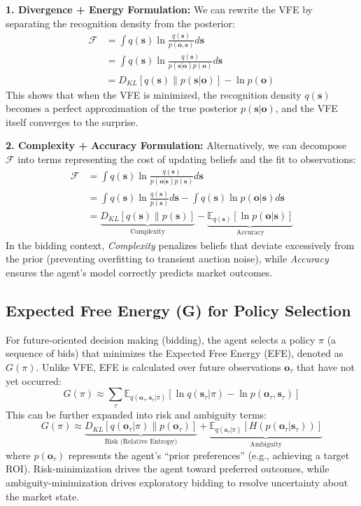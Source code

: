 \textbf{1. Divergence + Energy Formulation:}
We can rewrite the VFE by separating the recognition density from the posterior:
\begin{align}
    \mathcal{F} &= \int q(\mathbf{s}) \ln \frac{q(\mathbf{s})}{p(\mathbf{o}, \mathbf{s})} d\mathbf{s} \\
    &= \int q(\mathbf{s}) \ln \frac{q(\mathbf{s})}{p(\mathbf{s}|\mathbf{o})p(\mathbf{o})} d\mathbf{s} \\
    &= D_{KL}[q(\mathbf{s}) \| p(\mathbf{s}|\mathbf{o})] - \ln p(\mathbf{o})
\end{align}
This shows that when the VFE is minimized, the recognition density $q(\mathbf{s})$ becomes a perfect approximation of the true posterior $p(\mathbf{s}|\mathbf{o})$, and the VFE itself converges to the surprise.

\textbf{2. Complexity + Accuracy Formulation:}
Alternatively, we can decompose $\mathcal{F}$ into terms representing the cost of updating beliefs and the fit to observations:
\begin{align}
    \mathcal{F} &= \int q(\mathbf{s}) \ln \frac{q(\mathbf{s})}{p(\mathbf{o}|\mathbf{s})p(\mathbf{s})} d\mathbf{s} \\
    &= \int q(\mathbf{s}) \ln \frac{q(\mathbf{s})}{p(\mathbf{s})} d\mathbf{s} - \int q(\mathbf{s}) \ln p(\mathbf{o}|\mathbf{s}) d\mathbf{s} \\
    &= \underbrace{D_{KL}[q(\mathbf{s}) \| p(\mathbf{s})]}_{\text{Complexity}} - \underbrace{\mathbb{E}_{q(\mathbf{s})}[\ln p(\mathbf{o}|\mathbf{s})]}_{\text{Accuracy}}
\end{align}
In the bidding context, \textit{Complexity} penalizes beliefs that deviate excessively from the prior (preventing overfitting to transient auction noise), while \textit{Accuracy} ensures the agent's model correctly predicts market outcomes.

\subsection{Expected Free Energy (G) for Policy Selection}
For future-oriented decision making (bidding), the agent selects a policy $\pi$ (a sequence of bids) that minimizes the Expected Free Energy (EFE), denoted as $G(\pi)$. Unlike VFE, EFE is calculated over future observations $\mathbf{o}_\tau$ that have not yet occurred:
\begin{equation}
    G(\pi) \approx \sum_\tau \mathbb{E}_{q(\mathbf{o}_\tau, \mathbf{s}_\tau | \pi)} [\ln q(\mathbf{s}_\tau | \pi) - \ln p(\mathbf{o}_\tau, \mathbf{s}_\tau)]
\end{equation}
This can be further expanded into risk and ambiguity terms:
\begin{equation}
    G(\pi) \approx \underbrace{D_{KL}[q(\mathbf{o}_\tau | \pi) \| p(\mathbf{o}_\tau)]}_{\text{Risk (Relative Entropy)}} + \underbrace{\mathbb{E}_{q(\mathbf{s}_\tau | \pi)}[H(p(\mathbf{o}_\tau | \mathbf{s}_\tau))]}_{\text{Ambiguity}}
\end{equation}
where $p(\mathbf{o}_\tau)$ represents the agent's ``prior preferences'' (e.g., achieving a target ROI). Risk-minimization drives the agent toward preferred outcomes, while ambiguity-minimization drives exploratory bidding to resolve uncertainty about the market state.

